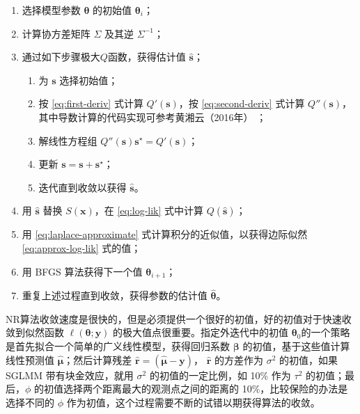 \documentclass[12pt,a4paper,UTF8,twoside]{book}
\providecommand{\tightlist}{%
  \setlength{\itemsep}{0pt}\setlength{\parskip}{0pt}}
\theoremstyle{definition}
\theoremstyle{definition}
\theoremstyle{definition}
\theoremstyle{remark}
\begin{document}
\begin{enumerate}
\def\labelenumi{\arabic{enumi}.}
\tightlist
\item
  选择模型参数 \(\boldsymbol{\theta}\) 的初始值 \(\boldsymbol{\theta}_{i}\)；
\item
  计算协方差矩阵 \(\Sigma\) 及其逆 \(\Sigma^{-1}\)；
\item
  通过如下步骤极大\(Q\)函数，获得估计值 \(\hat{\mathbf{s}}\)；

  \begin{enumerate}
  \def\labelenumii{(\alph{enumii})}
  \tightlist
  \item
    为 \(\mathbf{s}\) 选择初始值；
  \item
    按 \eqref{eq:first-deriv} 式计算 \(Q'(\mathbf{s})\)，按 \eqref{eq:second-deriv} 式计算 \(Q''(\mathbf{s})\)，其中导数计算的代码实现可参考黄湘云（2016年） \citep{Huang2016COS}；
  \item
    解线性方程组 \(Q''(\mathbf{s})\mathbf{s}^{\star} = Q'(\mathbf{s})\)；
  \item
    更新 \(\mathbf{s = s + s^{\star}}\)；
  \item
    迭代直到收敛以获得 \(\hat{\mathbf{s}}\)。
  \end{enumerate}
\item
  用 \(\hat{\mathbf{s}}\) 替换 \(S(\mathbf{x})\)，在 \eqref{eq:log-lik} 式中计算 \(Q(\hat{\mathbf{s}})\)；
\item
  用 \eqref{eq:laplace-approximate} 式计算积分的近似值，以获得边际似然 \eqref{eq:approx-log-lik} 式的值；
\item
  用 BFGS 算法获得下一个值 \(\boldsymbol{\theta}_{i+1}\)；
\item
  重复上述过程直到收敛，获得参数的估计值 \(\hat{\boldsymbol{\theta}}\)。
\end{enumerate}

NR算法收敛速度是很快的，但是必须提供一个很好的初值，好的初值对于快速收敛到似然函数 \(\ell(\boldsymbol{\theta};\mathbf{y})\) 的极大值点很重要。指定外迭代中的初值 \(\boldsymbol{\theta}_{0}\)的一个策略是首先拟合一个简单的广义线性模型，获得回归系数 \(\boldsymbol{\beta}\) 的初值，基于这些值计算线性预测值 \(\hat{\boldsymbol{\mu}}\)；然后计算残差 \(\hat{\boldsymbol{r}} = (\hat{\boldsymbol{\mu}} - \mathbf{y})\)， \(\hat{\boldsymbol{r}}\) 的方差作为 \(\sigma^2\) 的初值，如果 SGLMM 带有块金效应，就用 \(\sigma^2\) 的初值的一定比例，如 10\% 作为 \(\tau^2\) 的初值；最后，\(\phi\) 的初值选择两个距离最大的观测点之间的距离的 10\%，比较保险的办法是选择不同的 \(\phi\) 作为初值，这个过程需要不断的试错以期获得算法的收敛\citep{Bonat2016Practical}。
\end{document}
